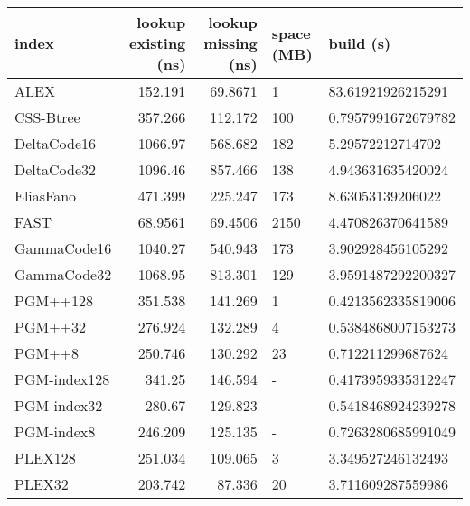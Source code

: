 \begin{tabular}{lrrll}
\hline
 index             &   lookup existing (ns) &   lookup missing (ns) & space (MB)   & build (s)             \\
\hline
 ALEX              &               152.191  &               69.8671 & 1            & 83.61921926215291     \\
 CSS-Btree         &               357.266  &              112.172  & 100          & 0.7957991672679782    \\
 DeltaCode16       &              1066.97   &              568.682  & 182          & 5.29572212714702      \\
 DeltaCode32       &              1096.46   &              857.466  & 138          & 4.943631635420024     \\
 EliasFano         &               471.399  &              225.247  & 173          & 8.63053139206022      \\
 FAST              &                68.9561 &               69.4506 & 2150         & 4.470826370641589     \\
 GammaCode16       &              1040.27   &              540.943  & 173          & 3.902928456105292     \\
 GammaCode32       &              1068.95   &              813.301  & 129          & 3.9591487292200327    \\
 PGM++128          &               351.538  &              141.269  & 1            & 0.4213562335819006    \\
 PGM++32           &               276.924  &              132.289  & 4            & 0.5384868007153273    \\
 PGM++8            &               250.746  &              130.292  & 23           & 0.712211299687624     \\
 PGM-index128      &               341.25   &              146.594  & -            & 0.4173959335312247    \\
 PGM-index32       &               280.67   &              129.823  & -            & 0.5418468924239278    \\
 PGM-index8        &               246.209  &              125.135  & -            & 0.7263280685991049    \\
 PLEX128           &               251.034  &              109.065  & 3            & 3.349527246132493     \\
 PLEX32            &               203.742  &               87.336  & 20           & 3.711609287559986     \\

\end{tabular}
